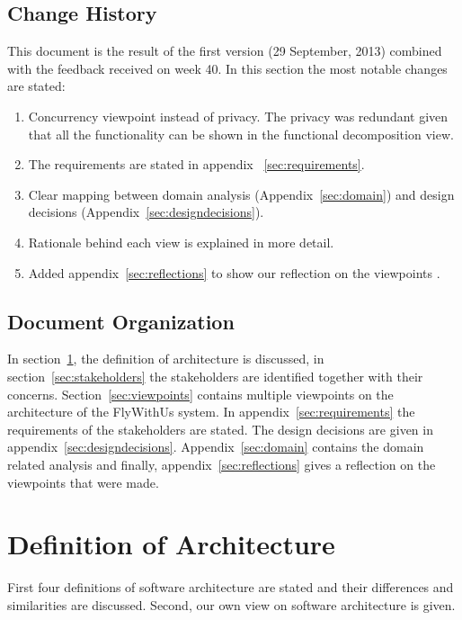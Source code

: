\documentclass{article}
\begin{document}
\subsection{Change History}
This document is the result of the first version (29 September, 2013) combined with the feedback received on week 40. In this section the most notable changes are stated:
\begin{enumerate}
\item Concurrency viewpoint instead of privacy. The privacy was redundant given that all the functionality can be shown in the functional decomposition view. 
\item The requirements are stated in appendix ~\ref{sec:requirements}.
\item Clear mapping between domain analysis (Appendix~\ref{sec:domain}) and design decisions (Appendix~\ref{sec:designdecisions}).
\item Rationale behind each view is explained in more detail.
\item Added appendix~\ref{sec:reflections} to show our reflection on the viewpoints .
\end{enumerate}

\subsection{Document Organization}
In  section~\ref{sec:definition}, the definition of architecture is discussed, in  section~\ref{sec:stakeholders} the stakeholders are identified together with their concerns. Section~\ref{sec:viewpoints} contains multiple viewpoints on the architecture of the FlyWithUs system. In appendix~\ref{sec:requirements} the requirements of the stakeholders are stated. The design decisions are given in appendix~\ref{sec:designdecisions}. Appendix~\ref{sec:domain} contains the domain related analysis and finally, appendix~\ref{sec:reflections} gives a reflection on the viewpoints that were made. 

\section{Definition of Architecture}
\label{sec:definition}
First four definitions of software architecture are stated and their differences
and similarities are discussed. Second, our own view on software architecture is
given.
\end{document}
